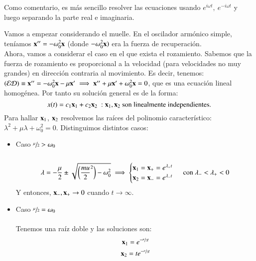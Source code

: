 \begin{obs}
    Como comentario, es más sencillo resolver las ecuaciones usando $e^{i \omega t},\ e^{-i \omega t}$ y luego separando la parte real e imaginaria.
\end{obs}
\begin{eg}
    Vamos a empezar considerando el muelle. En el oscilador armónico simple, teníamos $\mathbf{x}'' = -\omega_0^2\mathbf{x}$ (donde $-\omega_0^2 \mathbf{x})$ era la fuerza de recuperación.\\
    Ahora, vamos a considerar el caso en el que exista el rozamiento. Sabemos que la fuerza de rozamiento es proporcional a la velocidad (para velocidades no muy grandes) en dirección contraria al movimiento. Es decir, tenemos: $(\mathcal{ED}) \equiv \mathbf{x}'' = -\omega_0^2\mathbf{x} - \mu \mathbf{x}' \implies \mathbf{x}'' + \mu \mathbf{x}' + \omega_0^2\mathbf{x} = 0$, que es una ecuación lineal homogénea. Por tanto su solución general es de la forma:
    $$
        x(t) = c_1 \mathbf{x}_1 + c_2 \mathbf{x}_2\ : \mathbf{x}_1, \mathbf{x}_2\text{ son linealmente independientes.}
    $$
    Para hallar $\mathbf{x}_1$, $\mathbf{x}_2$ resolvemos las raíces del polinomio característico: $\lambda^2 + \mu \lambda + \omega_0^2 = 0$. Distinguimos distintos casos:\\
    \begin{itemize}
        \item Caso $\sfrac{\mu}{2} > \omega_0$\\\\
        $$
            \lambda = -\frac{\mu}{2} \pm \sqrt{\left(\frac{mu}{2}^2\right) - \omega_0^2} \implies
            \begin{cases}
                \mathbf{x}_1 = \mathbf{x}_+ = e^{\lambda_+ t}\\
                \mathbf{x}_2 = \mathbf{x}_- = e^{\lambda_- t}
            \end{cases} \text{ con } \lambda_- < \lambda_+ < 0
        $$
        Y entonces, $\mathbf{x}_-, \mathbf{x}_+ \to 0$ cuando $t \to \infty$.
        \item Caso $\sfrac{\mu}{2} = \omega_0$\\\\
        Tenemos una raíz doble y las soluciones son:
        \begin{gather*}
            \mathbf{x}_1 = e^{-\sfrac{\mu}{2} t}\\
            \mathbf{x}_2 = t e^{-\sfrac{\mu}{2} t}
        \end{gather*}

\end{itemize}
\end{eg}

